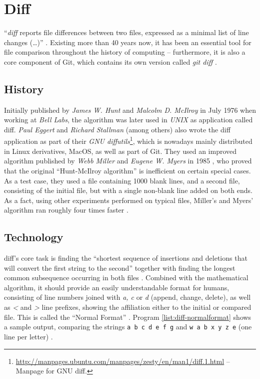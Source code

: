 \section{Diff}
\label{sec:diff}

``\emph{diff} reports file differences between two files, expressed as a minimal list of line changes (\ldots)'' \cite[1]{Hunt1976}. Existing more than 40 years now, it has been an essential tool for file comparison throughout the history of computing -- furthermore, it is also a core component of Git, which contains its own version called \emph{git diff} \cite[108]{loeliger2012version}.

\subsection{History}
\label{sec:diff-history}
Initially published by \emph{James W. Hunt} and \emph{Malcolm D. McIlroy} in July 1976 when working at \emph{Bell Labs}, the algorithm was later used in \emph{UNIX} as application called diff. \emph{Paul Eggert} and \emph{Richard Stallman} (among others) also wrote the diff application as part of their \emph{GNU diffutils}\footnote{\url{http://manpages.ubuntu.com/manpages/zesty/en/man1/diff.1.html} -- Manpage for GNU diff.}, which is nowadays mainly distributed in Linux derivatives, MacOS, as well as part of Git. They used an improved algorithm published by \emph{Webb Miller} and \emph{Eugene W. Myers} in 1985 \cite[3]{mackenzie2003comparing}, who proved that the original ``Hunt-McIlroy algorithm'' is inefficient on certain special cases. As a test case, they used a file containing 1000 blank lines, and a second file, consisting of the initial file, but with a single non-blank line added on both ends. As a fact, using other experiments performed on typical files, Miller's and Myers' algorithm ran roughly four times faster \cite[p. 1034f]{miller1985file}.

\subsection{Technology}
diff's core task is finding the ``shortest sequence of insertions and deletions that will convert the first string to the second'' \cite[1025]{miller1985file} together with finding the longest common subsequence occurring in both files \cite[2]{Hunt1976}. Combined with the mathematical algorithm, it should provide an easily understandable format for humans, consisting of line numbers joined with \emph{a, c} or \emph{d} (append, change, delete), as well as \emph{<} and \emph{>} line prefixes, showing the affiliation either to the initial or compared file. This is called the ``Normal Format'' \cite[12]{mackenzie2003comparing}. Program \ref{list:diff-normalformat} shows a sample output, comparing the strings \texttt{a b c d e f g} and \texttt{w a b x y z e} (one line per letter) \cite[p. 1f]{Hunt1976}.

